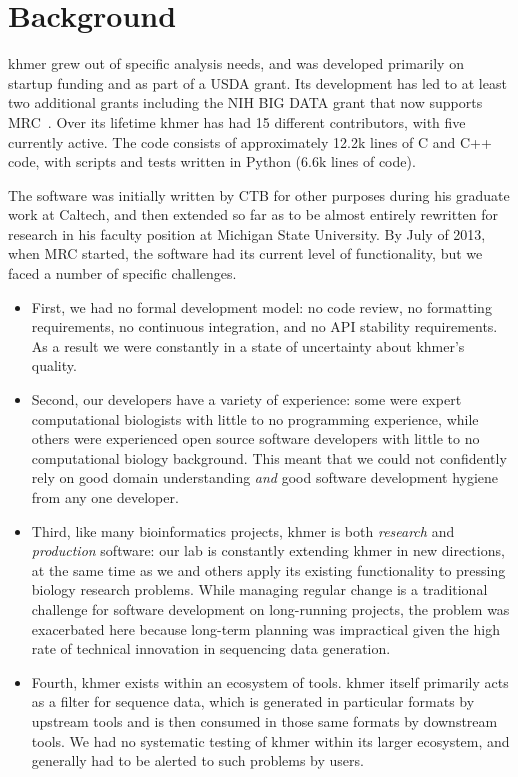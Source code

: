 \documentclass[12pt]{article}
\begin{document}
\section{Background}

khmer grew out of specific analysis needs, and was developed primarily
on startup funding and as part of a USDA grant.  Its development has
led to at least two additional grants including the NIH BIG DATA
grant that now supports MRC~\cite{brown2012bigdata}.  Over its lifetime
khmer has had 15 different contributors, with five currently active.
The code consists of approximately 12.2k lines of C and C++ code, with
scripts and tests written in Python (6.6k lines of code).

The software was initially written by CTB for other purposes during
his graduate work at Caltech, and then extended so far as to be almost
entirely rewritten for research in his faculty position at Michigan
State University.  By July of 2013, when MRC started, the software had
its current level of functionality, but we faced a number of specific
challenges.

\begin{itemize}
\item First, we had no formal development model: no code review, no
  formatting requirements, no continuous integration, and no API
  stability requirements.  As a result we were constantly in a
  state of uncertainty about khmer's quality.

\item Second, our developers have a variety of experience: some were
  expert computational biologists with little to no programming
  experience, while others were experienced open source software
  developers with little to no computational biology background.  This
  meant that we could not confidently rely on good domain
  understanding {\em and} good software development hygiene from any
  one developer.

\item Third, like many bioinformatics projects, khmer is both {\em
  research} and {\em production} software: our lab is constantly
  extending khmer in new directions, at the same time as we and others
  apply its existing functionality to pressing biology research
  problems. While managing regular change is a traditional challenge
  for software development on long-running projects, the problem was
  exacerbated here because long-term planning was impractical given
  the high rate of technical innovation in sequencing data generation.

\item Fourth, khmer exists within an ecosystem of tools. khmer itself
  primarily acts as a filter for sequence data, which is generated in
  particular formats by upstream tools and is then consumed in those
  same formats by downstream tools.  We had no systematic testing of
  khmer within its larger ecosystem, and generally had to be alerted
  to such problems by users.

\end{itemize}
\end{document}
